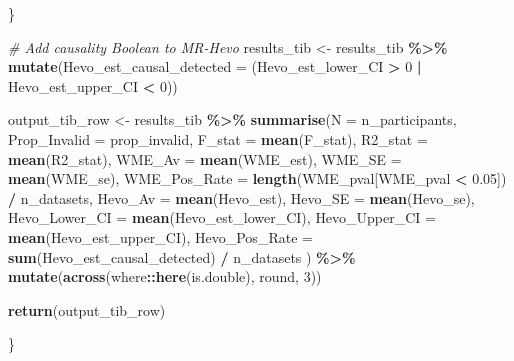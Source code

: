 \documentclass[
]{article}
\newenvironment{Shaded}{\begin{snugshade}}{\end{snugshade}}
\newcommand{\AttributeTok}[1]{\textcolor[rgb]{0.13,0.29,0.53}{#1}}
\newcommand{\CommentTok}[1]{\textcolor[rgb]{0.56,0.35,0.01}{\textit{#1}}}
\newcommand{\DecValTok}[1]{\textcolor[rgb]{0.00,0.00,0.81}{#1}}
\newcommand{\FloatTok}[1]{\textcolor[rgb]{0.00,0.00,0.81}{#1}}
\newcommand{\FunctionTok}[1]{\textcolor[rgb]{0.13,0.29,0.53}{\textbf{#1}}}
\newcommand{\NormalTok}[1]{#1}
\newcommand{\OtherTok}[1]{\textcolor[rgb]{0.56,0.35,0.01}{#1}}
\newcommand{\SpecialCharTok}[1]{\textcolor[rgb]{0.81,0.36,0.00}{\textbf{#1}}}
\begin{document}
\begin{Shaded}
\begin{Highlighting}[]
\NormalTok{  \}}
  
  \CommentTok{\# Add causality Boolean to MR{-}Hevo}
\NormalTok{  results\_tib }\OtherTok{\textless{}{-}}\NormalTok{ results\_tib }\SpecialCharTok{\%\textgreater{}\%}
    \FunctionTok{mutate}\NormalTok{(}\AttributeTok{Hevo\_est\_causal\_detected =}\NormalTok{ (Hevo\_est\_lower\_CI }\SpecialCharTok{\textgreater{}} \DecValTok{0}  \SpecialCharTok{|}\NormalTok{ Hevo\_est\_upper\_CI }\SpecialCharTok{\textless{}} \DecValTok{0}\NormalTok{))}
  
  
\NormalTok{  output\_tib\_row }\OtherTok{\textless{}{-}}\NormalTok{ results\_tib }\SpecialCharTok{\%\textgreater{}\%} 
    \FunctionTok{summarise}\NormalTok{(}\AttributeTok{N =}\NormalTok{ n\_participants,}
              \AttributeTok{Prop\_Invalid =}\NormalTok{ prop\_invalid,}
              \AttributeTok{F\_stat =} \FunctionTok{mean}\NormalTok{(F\_stat),}
              \AttributeTok{R2\_stat =} \FunctionTok{mean}\NormalTok{(R2\_stat),}
              \AttributeTok{WME\_Av =} \FunctionTok{mean}\NormalTok{(WME\_est),}
              \AttributeTok{WME\_SE =} \FunctionTok{mean}\NormalTok{(WME\_se),}
              \AttributeTok{WME\_Pos\_Rate =} \FunctionTok{length}\NormalTok{(WME\_pval[WME\_pval }\SpecialCharTok{\textless{}} \FloatTok{0.05}\NormalTok{]) }\SpecialCharTok{/}\NormalTok{ n\_datasets,}
              \AttributeTok{Hevo\_Av =} \FunctionTok{mean}\NormalTok{(Hevo\_est),}
              \AttributeTok{Hevo\_SE =} \FunctionTok{mean}\NormalTok{(Hevo\_se),}
              \AttributeTok{Hevo\_Lower\_CI =} \FunctionTok{mean}\NormalTok{(Hevo\_est\_lower\_CI),}
              \AttributeTok{Hevo\_Upper\_CI =} \FunctionTok{mean}\NormalTok{(Hevo\_est\_upper\_CI),}
              \AttributeTok{Hevo\_Pos\_Rate =} \FunctionTok{sum}\NormalTok{(Hevo\_est\_causal\_detected) }\SpecialCharTok{/}\NormalTok{ n\_datasets}
\NormalTok{    ) }\SpecialCharTok{\%\textgreater{}\%} 
    \FunctionTok{mutate}\NormalTok{(}\FunctionTok{across}\NormalTok{(where}\SpecialCharTok{::}\FunctionTok{here}\NormalTok{(is.double), round, }\DecValTok{3}\NormalTok{))}
  
  \FunctionTok{return}\NormalTok{(output\_tib\_row)}
  
\NormalTok{\}}
\end{Highlighting}
\end{Shaded}
\end{document}

